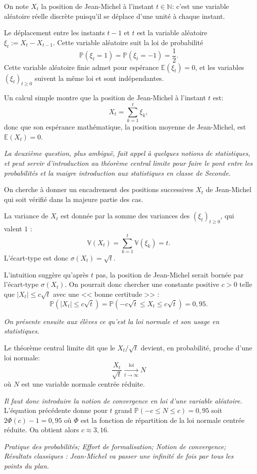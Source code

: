 \documentclass[12pt]{article}
\newcommand{\NN}{\mathbb N}
\newcommand{\PP}{\mathbb P}
\newcommand{\EE}{\mathbb E}
\newcommand{\VV}{\mathbb V}
\theoremstyle{definition}
\begin{document}
On note $X_t$ la position de Jean-Michel à l'instant $t\in\NN$: c'est une variable aléatoire réelle discrète puisqu'il se déplace d'une unité à chaque instant.

Le déplacement entre les instants $t-1$ et $t$ est la variable aléatoire $\xi_t := X_t-X_{t-1}$. Cette variable aléatoire suit la loi de probabilité
\[
\PP(\xi_t = 1) = \PP(\xi_t = -1) = \frac{1}{2}. 
\]
Cette variable aléatoire finie admet pour espérance $\EE(\xi_t) = 0$, et les variables $(\xi_t)_{t\geq 0}$ suivent la même loi et sont indépendantes.

Un calcul simple montre que la position de Jean-Michel à l'instant $t$ est:
\[
X_t = \sum_{k=1}^t \xi_k,
\]
donc que son espérance mathématique, la position moyenne de Jean-Michel, est $\EE(X_t) = 0$.

\textit{La deuxième question, plus ambiguë, fait appel à quelques notions de statistiques, et peut servir d'introduction au théorème central limite pour faire le pont entre les probabilités et la maigre introduction aux statistiques en classe de Seconde.}

On cherche à donner un encadrement des positions successives $X_t$ de Jean-Michel qui soit vérifié dans la majeure partie des cas.

La variance de $X_t$ est donnée par la somme des variances des $(\xi_t)_{t\geq 0}$, qui valent $1$ :
\[
\VV(X_t) = \sum_{k=1}^t \VV(\xi_k) = t.
\]
L'écart-type est donc $\sigma(X_t) = \sqrt{t}$.

L'intuition suggère qu'après $t$ pas, la position de Jean-Michel serait bornée par l'écart-type $\sigma(X_t)$. On pourrait donc chercher une constante positive $c > 0$ telle que $|X_t| \leq c\sqrt{t}$ avec une << bonne certitude >> :
\[
\PP\left(|X_t|\leq c\sqrt t\right) =
\PP\left(-c\sqrt t \leq X_t \leq c\sqrt t\right) = 0,\!95.
\]

\textit{On présente ensuite aux élèves ce qu'est la loi normale et son usage en statistiques.}


Le théorème central limite dit que le $X_t/\sqrt{t}$ devient, en probabilité, proche d'une loi normale:
\[
\frac{X_t}{\sqrt{t}} \xrightarrow[t\to\infty]{\text{loi}} N
\]
où $N$ est une variable normale centrée réduite.

\textit{Il faut donc introduire la notion de convergence en loi d'une variable aléatoire.}
L'équation précédente donne pour $t$ grand $\PP(-c \leq N \leq c) = 0,\!95$ soit $2\Phi(c) - 1 = 0,\!95$ où $\Phi$ est la fonction de répartition de la loi normale centrée réduite. On obtient alors $c\approx 3,\!16$.

\textit{Pratique des probabilités; Effort de formalisation; Notion de convergence; Résultats classiques : Jean-Michel va passer une infinité de fois par tous les points du plan.}
\end{document}

